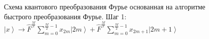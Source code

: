 \begin{figure}
\centering



\caption{Схема квантового преобразования Фурье основанная на алгоритме
быстрого преобразования Фурье. Шаг 1: 
$\left|x\right> \rightarrow
\hat{F}^{\frac{M}{2}} \sum_{m = 0}^{\frac{M}{2} - 1}x_{2m} \left|2m\right> +
\hat{F}^{\frac{M}{2}} \sum_{m = 0}^{\frac{M}{2} - 1}x_{2m + 1} \left|2m+1\right>$}
\label{figQuantCompQuantFourier1}
\end{figure}
